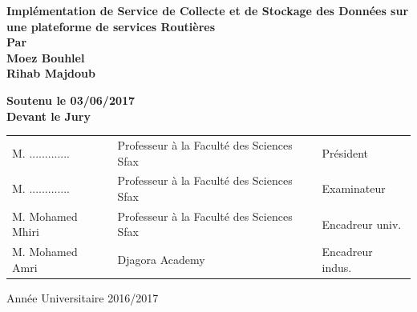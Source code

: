 \begin{titlepage}
    {\bfseries \Huge \color[RGB]{16,121,196}
        Implémentation de Service de Collecte et de Stockage des Données sur une plateforme de services Routières
    }\\[0.3in]

    {\bfseries \large Par} \\[0.25in]

    {\bfseries \LARGE \color[RGB]{255,90,90}
        Moez Bouhlel \\
        Rihab Majdoub
    }

    \vspace{0.4in}
    {\large \bfseries
        Soutenu le 03/06/2017 \\
        Devant le Jury
    }\\[0.3in]

    \normalsize
    \bfseries
    \setlength{\tabcolsep}{10pt}
    \begin{tabular}{l l l}
        M. ............. & Professeur à la Faculté des Sciences Sfax & Président \\
        M. ............. & Professeur à la Faculté des Sciences Sfax & Examinateur \\
        M. Mohamed Mhiri & Professeur à la Faculté des Sciences Sfax & Encadreur univ. \\
        M. Mohamed Amri & Djagora Academy & Encadreur indus.
    \end{tabular}

    \vfill
    Année Universitaire 2016/2017

\end{titlepage}
\restoregeometry

